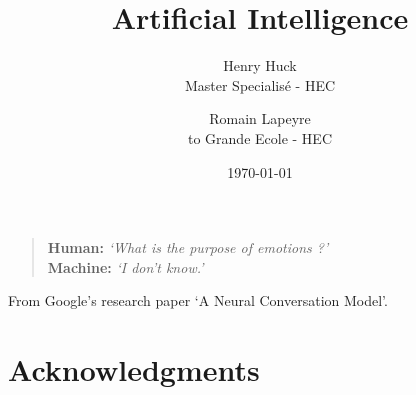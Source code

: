 \documentclass[12pt]{article}
\title{Artificial Intelligence}
\author{
        Henry Huck \\
        Master Specialisé - HEC \\
        \and
        Romain Lapeyre\\to
        Grande Ecole - HEC\\
}
\date{\today}
\begin{document}
\maketitle
\thispagestyle{empty}

\pagebreak


\phantom{TEXT}
\thispagestyle{empty}

\vspace{200pt}
\begin{quotation}
\noindent \textbf{Human:}  \textit{\lq What is the purpose of emotions ?\rq }
\\

\noindent \textbf{Machine:} \textit{\lq I don't know.\rq}
\end{quotation}

\vspace{200pt}

\begin{flushright}
   From Google's research paper \lq A Neural Conversation Model\rq. \cite{seq2seq}
\end{flushright}


\pagebreak


\smallskip

\tableofcontents

\pagebreak


\section*{Acknowledgments}

\bigskip

\bigskip
\end{document}
